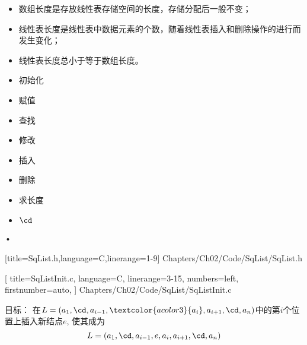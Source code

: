 \begin{frame}[fragile]\ft{\subsecname}


\end{frame}
%
\begin{frame}\ft{\subsecname}
\begin{zhu}[数据长度与线性表长度的区别]
\begin{itemize}
\item 数组长度是存放线性表存储空间的长度，存储分配后一般不变； 
\item 线性表长度是线性表中数据元素的个数，随着线性表插入和删除操作的进行而发生变化； 
\item 线性表长度总小于等于数组长度。
\end{itemize}
\end{zhu}
\end{frame}
%
\begin{frame}
\begin{itemize}
\item
初始化
\item
赋值
\item
查找
\item
修改
\item
插入
\item
删除
\item
求长度
\item
$\cd$
\end{itemize}•
\end{frame}
%

\begin{frame}[fragile]

[title=SqList.h,language=C,linerange={1-9}]
{Chapters/Ch02/Code/SqList/SqList.h}
\end{frame}
%
\begin{frame}[fragile]

[
title=SqListInit.c,
language=C,
linerange={3-15},
numbers=left,
firstnumber=auto,
]
{Chapters/Ch02/Code/SqList/SqListInit.c}
\end{frame}

\begin{frame}[fragile]
\textcolor{acolor5}{目标：}
在$L=(a_1,\cd,a_{i-1},\textcolor{acolor3}{a_i},a_{i+1},\cd,a_n)$中的第$i$个位置上插入新结点$e$,  使其成为
$$
L=(a_1,\cd,a_{i-1},e,a_i,a_{i+1},\cd,a_n)
$$
\end{frame}

